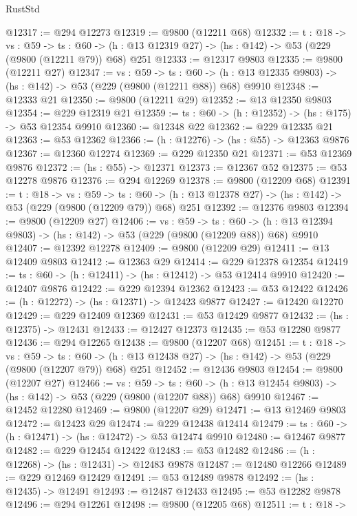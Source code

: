 \begin{lexlean}{RustStd}
\begin{coremodule}
@12317 := @294 @12273
@12319 := @9800 (@12211 @68)
@12332 := {t : @18} ->
  {vs : @59} ->
  {ts : @60} -> (h : @13 @12319 @27) -> (hs : @142) -> @53 (@229 (@9800 (@12211 @79)) @68) @251
@12333 := @12317 @9803
@12335 := @9800 (@12211 @27)
@12347 := {vs : @59} ->
  {ts : @60} -> (h : @13 @12335 @9803) -> (hs : @142) -> @53 (@229 (@9800 (@12211 @88)) @68) @9910
@12348 := @12333 @21
@12350 := @9800 (@12211 @29)
@12352 := @13 @12350 @9803
@12354 := @229 @12319 @21
@12359 := {ts : @60} -> (h : @12352) -> (hs : @175) -> @53 @12354 @9910
@12360 := @12348 @22
@12362 := @229 @12335 @21
@12363 := @53 @12362
@12366 := (h : @12276) -> (hs : @55) -> @12363 @9876
@12367 := @12360 @12274
@12369 := @229 @12350 @21
@12371 := @53 @12369 @9876
@12372 := (hs : @55) -> @12371
@12373 := @12367 @52
@12375 := @53 @12278 @9876
@12376 := @294 @12269
@12378 := @9800 (@12209 @68)
@12391 := {t : @18} ->
  {vs : @59} ->
  {ts : @60} -> (h : @13 @12378 @27) -> (hs : @142) -> @53 (@229 (@9800 (@12209 @79)) @68) @251
@12392 := @12376 @9803
@12394 := @9800 (@12209 @27)
@12406 := {vs : @59} ->
  {ts : @60} -> (h : @13 @12394 @9803) -> (hs : @142) -> @53 (@229 (@9800 (@12209 @88)) @68) @9910
@12407 := @12392 @12278
@12409 := @9800 (@12209 @29)
@12411 := @13 @12409 @9803
@12412 := @12363 @29
@12414 := @229 @12378 @12354
@12419 := {ts : @60} -> (h : @12411) -> (hs : @12412) -> @53 @12414 @9910
@12420 := @12407 @9876
@12422 := @229 @12394 @12362
@12423 := @53 @12422
@12426 := (h : @12272) -> (hs : @12371) -> @12423 @9877
@12427 := @12420 @12270
@12429 := @229 @12409 @12369
@12431 := @53 @12429 @9877
@12432 := (hs : @12375) -> @12431
@12433 := @12427 @12373
@12435 := @53 @12280 @9877
@12436 := @294 @12265
@12438 := @9800 (@12207 @68)
@12451 := {t : @18} ->
  {vs : @59} ->
  {ts : @60} -> (h : @13 @12438 @27) -> (hs : @142) -> @53 (@229 (@9800 (@12207 @79)) @68) @251
@12452 := @12436 @9803
@12454 := @9800 (@12207 @27)
@12466 := {vs : @59} ->
  {ts : @60} -> (h : @13 @12454 @9803) -> (hs : @142) -> @53 (@229 (@9800 (@12207 @88)) @68) @9910
@12467 := @12452 @12280
@12469 := @9800 (@12207 @29)
@12471 := @13 @12469 @9803
@12472 := @12423 @29
@12474 := @229 @12438 @12414
@12479 := {ts : @60} -> (h : @12471) -> (hs : @12472) -> @53 @12474 @9910
@12480 := @12467 @9877
@12482 := @229 @12454 @12422
@12483 := @53 @12482
@12486 := (h : @12268) -> (hs : @12431) -> @12483 @9878
@12487 := @12480 @12266
@12489 := @229 @12469 @12429
@12491 := @53 @12489 @9878
@12492 := (hs : @12435) -> @12491
@12493 := @12487 @12433
@12495 := @53 @12282 @9878
@12496 := @294 @12261
@12498 := @9800 (@12205 @68)
@12511 := {t : @18} ->

\end{coremodule}
\end{lexlean}
